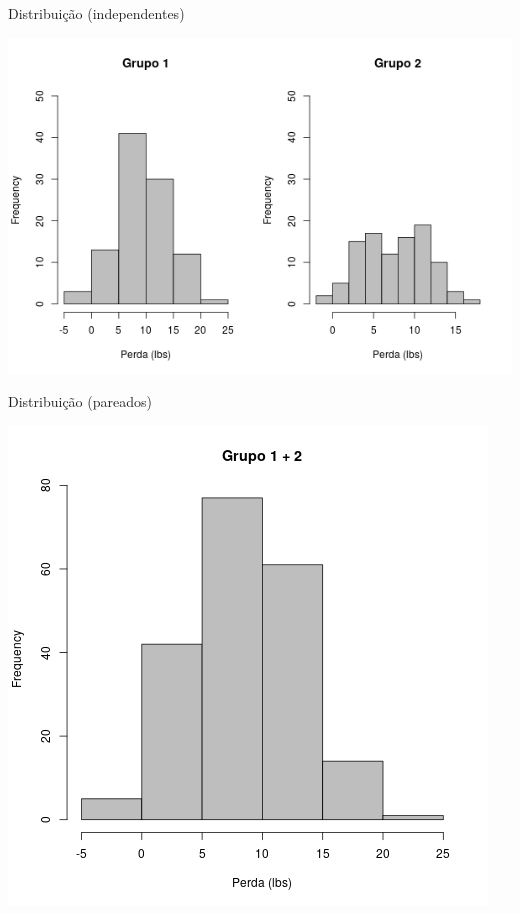 \documentclass{beamer}
\begin{document}
\begin{frame}{\scriptsize Distribuição (independentes)}
  \begin{center}
    \includegraphics[height=\textheight]{Cap23-25/obesidade-hist2}
  \end{center}
\end{frame}

\begin{frame}{\scriptsize Distribuição (pareados)}
  \begin{center}
    \includegraphics[height=\textheight]{Cap23-25/obesidade-hist1}
  \end{center}
\end{frame}
\end{document}
